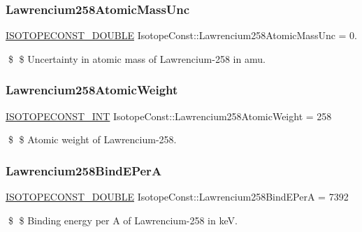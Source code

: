 \subsubsection{\texorpdfstring{Lawrencium258\+Atomic\+Mass\+Unc}{Lawrencium258AtomicMassUnc}}
{\footnotesize\ttfamily \mbox{\hyperlink{group___isotope_const-_macros_ga8f45a7272ce02c0b4c65c44636ed719a}{I\+S\+O\+T\+O\+P\+E\+C\+O\+N\+S\+T\+\_\+\+D\+O\+U\+B\+LE}} Isotope\+Const\+::\+Lawrencium258\+Atomic\+Mass\+Unc = 0.}

\$ \$ Uncertainty in atomic mass of Lawrencium-\/258 in amu. \mbox{\label{group___isotope_const-_lawrencium-_lr258_gadd4a271007a53e19d7db9d9133d070d6}} 
\subsubsection{\texorpdfstring{Lawrencium258\+Atomic\+Weight}{Lawrencium258AtomicWeight}}
{\footnotesize\ttfamily \mbox{\hyperlink{group___isotope_const-_macros_ga5f18360b3e99483a35c32d789e62621c}{I\+S\+O\+T\+O\+P\+E\+C\+O\+N\+S\+T\+\_\+\+I\+NT}} Isotope\+Const\+::\+Lawrencium258\+Atomic\+Weight = 258}

\$ \$ Atomic weight of Lawrencium-\/258. \mbox{\label{group___isotope_const-_lawrencium-_lr258_ga78cfde258d082d4011ca42f1f4ebea7f}} 
\subsubsection{\texorpdfstring{Lawrencium258\+Bind\+E\+PerA}{Lawrencium258BindEPerA}}
{\footnotesize\ttfamily \mbox{\hyperlink{group___isotope_const-_macros_ga8f45a7272ce02c0b4c65c44636ed719a}{I\+S\+O\+T\+O\+P\+E\+C\+O\+N\+S\+T\+\_\+\+D\+O\+U\+B\+LE}} Isotope\+Const\+::\+Lawrencium258\+Bind\+E\+PerA = 7392}

\$ \$ Binding energy per A of Lawrencium-\/258 in keV. \mbox{\label{group___isotope_const-_lawrencium-_lr258_ga9839213329583ca9faf3177425526295}} 
